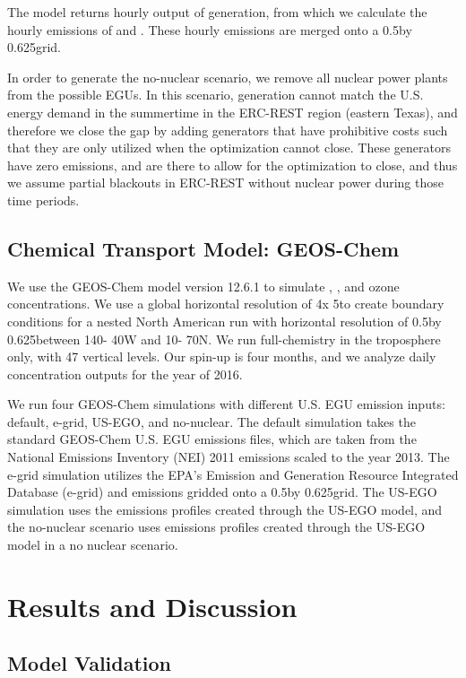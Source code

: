 \documentclass[12]{article}
\begin{document}
The model returns hourly output of generation, from which we calculate the hourly emissions of  and . These hourly emissions are merged onto a 0.5\degree by 0.625\degree grid. 

In order to generate the no-nuclear scenario, we remove all nuclear power plants from the possible EGUs. In this scenario, generation cannot match the U.S. energy demand in the summertime in the ERC-REST region (eastern Texas), and therefore we close the gap by adding generators that have prohibitive costs such that they are only utilized when the optimization cannot close. These generators have zero emissions, and are there to allow for the optimization to close, and thus we assume partial blackouts in ERC-REST  without nuclear power during those time periods.

\subsection{Chemical Transport Model: GEOS-Chem}
We use the GEOS-Chem model \citep{} version 12.6.1 \citep{noauthor_geos-chem_2019} to simulate , ,  and ozone concentrations. We use a global horizontal resolution of 4\degree x 5\degree to create boundary conditions for a nested North American run with horizontal resolution of 0.5\degree by 0.625\degree between 140\degree - 40\degree W and 10\degree - 70\degree N. We run full-chemistry in the troposphere only, with 47 vertical levels. Our spin-up is four months, and we analyze daily concentration outputs for the year of 2016. 

We run four GEOS-Chem simulations with different U.S. EGU emission inputs: default, e-grid, US-EGO, and no-nuclear. The default simulation takes the standard GEOS-Chem U.S. EGU emissions files, which are taken from the National Emissions Inventory (NEI) 2011 emissions scaled to the year 2013. The e-grid simulation utilizes the EPA's Emission and Generation Resource Integrated Database (e-grid) \citep{epa_emissions_2016}  and  emissions gridded onto a 0.5\degree by 0.625\degree grid. The US-EGO simulation uses the emissions profiles created through the US-EGO model, and the no-nuclear scenario uses emissions profiles created through the US-EGO model in a no nuclear scenario. 


\section{Results and Discussion}
\subsection{Model Validation}
\end{document}
